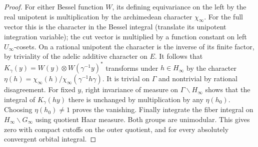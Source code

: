 \documentclass[a4paper,11pt]{article}
\theoremstyle{definition}
\theoremstyle{remark}
\numberwithin{equation}{section}
\begin{document}
\begin{proof}
For either Bessel function \(W\), its defining equivariance on
the left by the real unipotent is multiplication by the
archimedean character \(\chi_\infty\). For the full vector this
is the character in the Bessel integral (translate its unipotent
integration variable); the cut vector is multiplied by a function
constant on left \(U_\infty\)-cosets. On a rational unipotent
the character is the inverse of its finite factor, by triviality
of the adelic additive character on \(E\). It follows that
\(K_\gamma(y)=W(y)\otimes W(\gamma^{-1}y)^*\) transforms under
\(h\in H_\infty\) by the character
\(\eta(h)=\chi_\infty(h)/\chi_\infty(\gamma^{-1}h\gamma)\).
It is trivial on \(\Gamma\) and nontrivial by rational
disagreement. For fixed \(y\), right invariance of measure on
\(\Gamma\backslash H_\infty\) shows that the integral of
\(K_\gamma(hy)\) there is unchanged by multiplication by any
\(\eta(h_0)\). Choosing \(\eta(h_0)\ne1\) proves the vanishing.
Finally integrate the fiber integral on \(H_\infty\backslash
G_\infty\) using quotient Haar measure. Both groups are
unimodular. This gives zero with compact cutoffs on the outer
quotient, and for every absolutely convergent orbital integral.
\end{proof}
\end{document}
